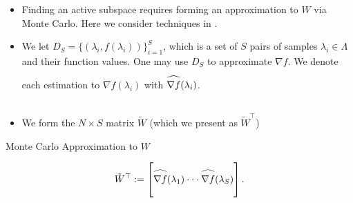 \documentclass[11pt]{beamer}
\newcommand\reallywidehat[1]{\arraycolsep=0pt\relax%
\begin{array}{c}
\stretchto{
  \scaleto{
    \scalerel*[\widthof{\ensuremath{#1}}]{\kern-.5pt\bigwedge\kern-.5pt}
    {\rule[-\textheight/2]{1ex}{\textheight}} %
  }{\textheight} %
}{0.5ex}\\           %
#1\\                 %
\rule{-1ex}{0ex}
\end{array}
}
\begin{document}
\begin{frame}

\begin{itemize}

\item Finding an active subspace requires forming an approximation to $W$ via Monte Carlo. Here we consider techniques in \footnotemark[1] \footnotemark[2].



\item We let $D_S=\{(\lambda_i,f(\lambda_i))\}_{i=1}^S$, which is a set of $S$ pairs of samples $\lambda_i \in \Lambda$ and their function values. One may use $D_S$ to approximate $\nabla f$. We denote each estimation to $\nabla f(\lambda_i)$ with $\reallywidehat{\nabla f}(\lambda_i)$.

\item We form the $N \times S$ matrix $\tilde{W}$ (which we present as $\tilde{W}^\top$)

\end{itemize}

\begin{block}{Monte Carlo Approximation to $W$ \footnotemark[1]}


\begin{equation} \label{eq:4}
\tilde{W}^\top:=\begin{bmatrix}
\reallywidehat{\nabla f}(\lambda_1)
\cdot \cdot \cdot
\reallywidehat{\nabla f}(\lambda_S)\\
\end{bmatrix}.
\end{equation}  

\end{block}


\end{frame}
\end{document}
